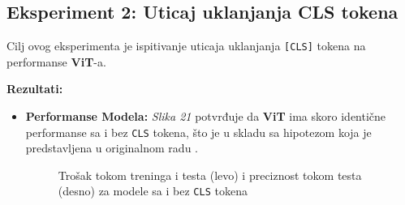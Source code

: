 \documentclass[12pt]{article}
\begin{document}
   \subsection{Eksperiment 2: Uticaj uklanjanja CLS tokena}
   Cilj ovog eksperimenta je ispitivanje uticaja uklanjanja \texttt{[CLS]} tokena na 
   performanse \textbf{ViT}-a.

   \textbf{Rezultati:}
   \begin{itemize}
      \item \textbf{Performanse Modela:} \textit{Slika 21} potvrđuje da \textbf{ViT}
      ima skoro identične performanse sa i bez \texttt{CLS} tokena, što je u 
      skladu sa hipotezom koja je predstavljena u originalnom radu \cite{vit}.
      \begin{figure}[h!]
         \centering
         \vspace{1cm} %
         \caption{Trošak tokom treninga i testa (levo) i preciznost tokom testa (desno) za modele sa i bez \texttt{CLS} tokena}
         \label{fig:exp2_metr}
      \end{figure}


\end{itemize}
\end{document}

